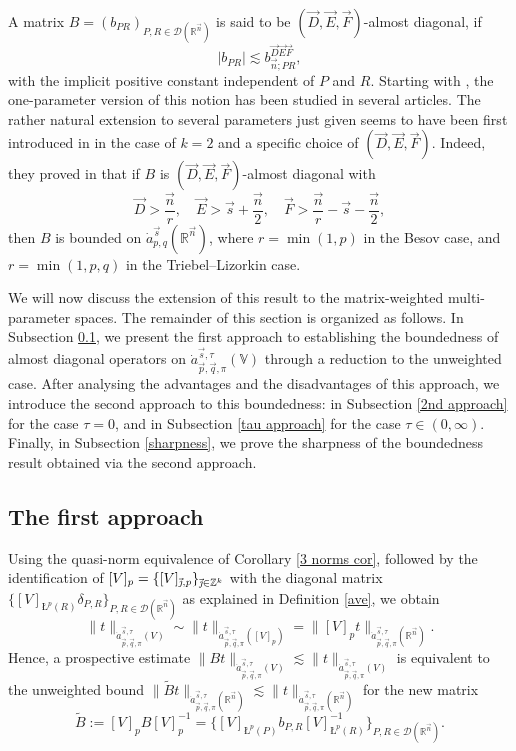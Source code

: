 \documentclass[11pt, reqno]{amsart}
\theoremstyle{definition}
\theoremstyle{remark}
\numberwithin{equation}{section}
\newcommand{\D}{\mathscr D}
\newcommand{\vD}{\vec D}
\newcommand{\vE}{\vec E}
\newcommand{\vF}{\vec F}
\newcommand{\R}{\mathbb R}
\newcommand{\V}{\mathbb V}
\newcommand{\Z}{\mathbb Z}
\newcommand{\vj}{\vec{\textit{\j}}}
\newcommand{\vn}{\vec n}
\newcommand{\vp}{\vec p}
\newcommand{\vq}{\vec q}
\newcommand{\vs}{\vec s}
\newcommand{\atau}{\dot a^{\vs,\tau}_{\vp,\vq,\pi}}
\newcommand{\aveL}{\textit{\L}}
\newcommand{\Red}[3]{[#1]_{#2,#3}}
\newcommand{\abs}[1]{|#1|}
\newcommand{\Norm}[2]{\|#1\|_{#2}}
\begin{document}
A matrix $B=(b_{PR})_{P,R\in\D(\R^{\vn})}$ is said to be $(\vD,\vE,\vF)$-almost diagonal, if
\begin{equation*}
\abs{b_{PR}}\lesssim b^{\vD \vE \vF}_{\vn;PR},
\end{equation*}
with the implicit positive constant independent of $P$ and $R$.
Starting with \cite{FJ90}, the one-parameter version of this notion
has been studied in several articles. The rather natural extension to several parameters just given seems to have been first introduced in \cite[Definition 5.1]{GKP21} in the case of $k=2$ and a specific choice of $(\vD,\vE,\vF)$. Indeed, they proved in \cite[Theorem 5.2]{GKP21} that if $B$ is $(\vD,\vE,\vF)$-almost diagonal with
\begin{equation}\label{GKPcond}
\vD>\frac{\vn}{r},\quad
\vE>\vs+\frac{\vn}{2},\quad
\vF>\frac{\vn}{r}-\vs-\frac{\vn}{2},
\end{equation}
then $B$ is bounded on $\dot a^{\vs}_{p,q}(\R^{\vn})$,
where $r=\min(1,p)$ in the Besov case,
and $r=\min(1,p,q)$ in the Triebel--Lizorkin case.

We will now discuss the extension of this result to the matrix-weighted multi-parameter spaces.
The remainder of this section is organized as follows.
In Subsection \ref{1st approach}, we present the first approach
to establishing the boundedness of almost diagonal operators on $\atau(\V)$ through a reduction to the unweighted case.
After analysing the advantages and the disadvantages of this approach, we introduce the second approach to this boundedness:
in Subsection \ref{2nd approach} for the case $\tau=0$,
and in Subsection \ref{tau approach} for the case $\tau\in(0,\infty)$.
Finally, in Subsection \ref{sharpness},
we prove the sharpness of the boundedness result obtained via the second approach.

\subsection{The first approach}\label{1st approach}

Using the quasi-norm equivalence of Corollary \ref{3 norms cor}, followed by the identification of $[V]_p=\{\Red{V}{\vj}{p}\}_{\vj\in\Z^k}$ with the diagonal matrix $\{[V]_{\aveL^p(R)}\delta_{P,R}\}_{P,R\in\D(\R^{\vn})}$ as explained in Definition \ref{ave}, we obtain
\begin{equation*}
\Norm{t}{\atau(V)}\sim\Norm{t}{\atau([V]_p)}
=\Norm{[V]_p t}{\atau(\R^{\vn})}.
\end{equation*}
Hence, a prospective estimate
$  \Norm{Bt}{\atau(V)}\lesssim\Norm{t}{\atau(V)}$
is equivalent to the unweighted bound
$  \Norm{\widetilde B t}{\atau(\R^{\vn})}\lesssim\Norm{t}{\atau(\R^{\vn})}$
for the new matrix
\begin{equation}\label{tildeB}
\widetilde B:=[V]_p B [V]_p^{-1} =\Big\{ [V]_{\aveL^p(P)} b_{P,R} [V]_{\aveL^p(R)}^{-1}
\Big\}_{ P,R\in\D(\R^{\vn})}.
\end{equation}
\end{document}
